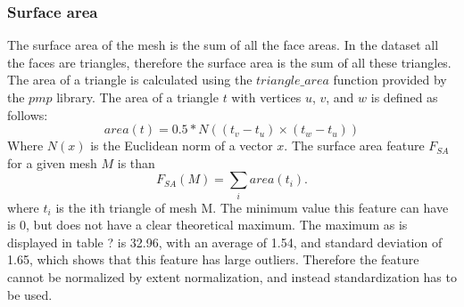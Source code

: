 \documentclass{bigdata}
\begin{document}
\subsubsection{Surface area}
The surface area of the mesh is the sum of all the face areas. In the dataset all the faces are triangles, therefore the surface area is the sum of all these triangles. The area of a triangle is calculated using the $triangle\_area$ function provided by the $pmp$ library. The area of a triangle $t$ with vertices $u$, $v$, and $w$ is defined as follows:
\begin{equation}
area(t) = 0.5 * N((t_v-t_u) \times (t_w-t_u))
\end{equation}
Where $N(x)$ is the Euclidean norm of a vector $x$. The surface area feature $F_{SA}$ for a given mesh $M$ is than
\begin{equation}
F_{SA}(M) = \sum\limits_{i} area(t_i).
\end{equation}
where $t_i$ is the ith triangle of mesh M. The minimum value this feature can have is 0, but does not have a clear theoretical maximum. The maximum as is displayed in table ? is 32.96, with an average of 1.54, and standard deviation of 1.65, which shows that this feature has large outliers. Therefore the feature cannot be normalized by extent normalization, and instead standardization has to be used. 
\end{document}
